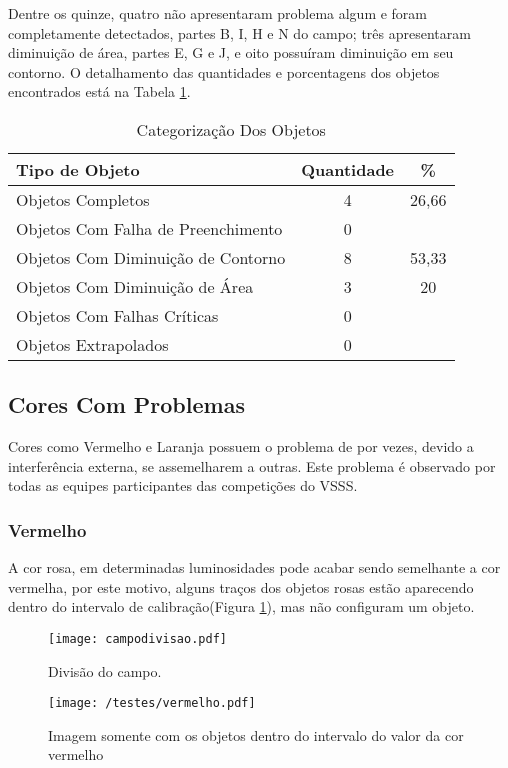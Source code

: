  Dentre os quinze, quatro não apresentaram problema algum e foram completamente detectados, partes B, I, H e N do campo; três apresentaram diminuição de área, partes E, G e J, e oito possuíram diminuição em seu contorno. O detalhamento das quantidades e porcentagens dos objetos encontrados está na Tabela \ref{tab:roxo}.
\begin{table}[H]
\centering
\begin{tabular}{l|c|c}
Tipo de Objeto & Quantidade  & \% \\ %
\hline                               %
Objetos Completos &  4 & 26,66\\
\hline 
Objetos Com Falha de Preenchimento & 0 \\
\hline 
Objetos Com Diminuição de Contorno &  8 & 53,33\\
\hline 
Objetos Com Diminuição de Área & 3 & 20\\
\hline 
Objetos Com Falhas Críticas & 0 \\
\hline \hline 
Objetos Extrapolados & 0 \\
\hline 
\end{tabular}
\caption{Categorização Dos Objetos}
\label{tab:roxo}
\end{table}
	\newpage
\subsection{Cores Com Problemas}
Cores como Vermelho e Laranja possuem o problema de por vezes, devido a interferência externa, se assemelharem a outras. Este problema é observado por todas as equipes participantes das competições do VSSS.
	
\subsubsection{Vermelho}


A cor rosa, em determinadas luminosidades pode acabar sendo semelhante a cor vermelha, por este motivo, alguns traços dos objetos rosas estão aparecendo dentro do intervalo de calibração(Figura \ref{fig:vermelho}), mas não configuram um objeto.
		\begin{figure}[H]
			\begin{minipage}[b]{0.45\linewidth}
				\centering
				\texttt{[image: campodivisao.pdf]}
				\caption{Divisão do campo.}				
			\end{minipage}
			\hspace{0.5cm}
			\begin{minipage}[b]{0.45\linewidth}
				\centering
				\texttt{[image: /testes/vermelho.pdf]}
				\caption{Imagem somente com os objetos dentro do intervalo do valor da cor vermelho}
				\label{fig:vermelho}
			\end{minipage}
		\end{figure}
		

